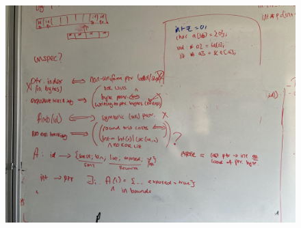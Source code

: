 \begin{figure}[h]
    \centering
    \includegraphics[width=\textwidth]{../misc/type-system-options.jpg}
\end{figure}
